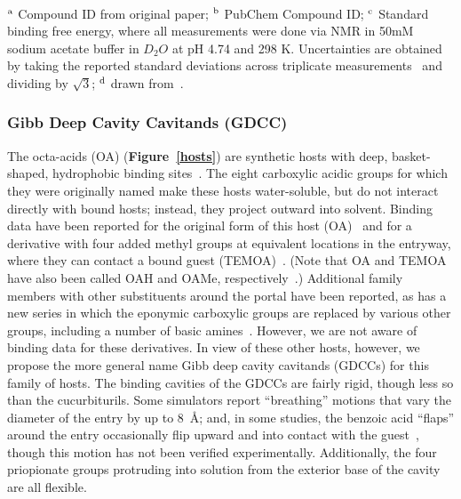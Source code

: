 \documentclass[aps,pre,twocolumn,nofootinbib,superscriptaddress,10pt, final,tightenlines]{revtex4-1}
\begin{document}
\begin{table}
\begin{tabular}{lllp{2cm}>{\ttfamily}lS[table-format=-1.2, table-figures-uncertainty=1]}
\bottomrule
\end{tabular}                                                                                                                                                                                                                                                           \\
$^{\rm a}$ Compound ID from original paper; $^{\rm b}$ PubChem Compound ID; $^{\rm c}$ Standard binding free energy, where all measurements were done via NMR in 50mM sodium acetate buffer in $D_2O$ at pH 4.74 and 298 K. Uncertainties are obtained by taking the reported standard deviations across triplicate measurements~\cite{isaacs_personal_2016} and dividing by $\sqrt 3$;  $^{\rm d}$ drawn from~\cite{liu_cucurbituril_2005}.
\end{table}
\endgroup


\subsubsection{Gibb Deep Cavity Cavitands (GDCC)}


The octa-acids (OA) ({\bf Figure~\ref{hosts}}) are synthetic hosts with deep, basket-shaped, hydrophobic binding sites~\cite{gibb_well-defined_2004}. 
The eight carboxylic acidic groups for which they were originally named make these hosts water-soluble, but do not interact directly with bound hosts; instead, they project outward into solvent. 
Binding data have been reported for the original form of this host (OA)~\cite{gibb_well-defined_2004} and for a derivative with four added methyl groups at equivalent locations in the entryway, where they can contact a bound guest (TEMOA)~\cite{gan_nonmonotonic_2011, sullivan_binding_2016}. 
(Note that OA and TEMOA have also been called OAH and OAMe, respectively~\cite{yin_overview_2016}.) 
Additional family members with other substituents around the portal have been reported, as has a new series in which the eponymic carboxylic groups are replaced by various other groups, including a number of basic amines~\cite{hillyer_synthesis_2016}. 
However, we are not aware of binding data for these derivatives. 
In view of these other hosts, however, we propose the more general name Gibb deep cavity cavitands (GDCCs) for this family of hosts. 
The binding cavities of the GDCCs are fairly rigid, though less so than the cucurbiturils. 
Some simulators report ``breathing'' motions that vary the diameter of the entry by up to 8~\AA \cite{mikulskis_free-energy_2014}; and, in some studies, the benzoic acid ``flaps'' around the entry occasionally flip upward and into contact with the guest~\cite{yin_sampl5_2016, tofoleanu_absolute_2016}, though this motion has not been verified experimentally. 
Additionally, the four priopionate groups protruding into solution from the exterior base of the cavity are all flexible. 
\end{document}
